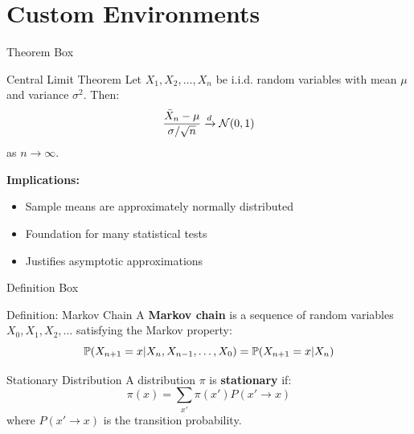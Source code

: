 \documentclass[aspectratio=169]{beamer}
\begin{document}
\section{Custom Environments}

\begin{frame}{Theorem Box}
  \begin{theorembox}{Central Limit Theorem}
    Let $X_1, X_2, \ldots, X_n$ be i.i.d. random variables with mean $\mu$ and variance $\sigma^2$. Then:
    $$\frac{\bar{X}_n - \mu}{\sigma/\sqrt{n}} \xrightarrow{d} \mathcal{N}(0, 1)$$
    as $n \to \infty$.
  \end{theorembox}

  \vspace{0.5em}

  \textbf{Implications:}
  \begin{itemize}
    \item Sample means are approximately normally distributed
    \item Foundation for many statistical tests
    \item Justifies asymptotic approximations
  \end{itemize}
\end{frame}

\begin{frame}{Definition Box}
  \begin{definitionbox}{Definition: Markov Chain}
    A \textbf{Markov chain} is a sequence of random variables $X_0, X_1, X_2, \ldots$ satisfying the Markov property:
    $$\mathbb{P}(X_{n+1} = x | X_n, X_{n-1}, \ldots, X_0) = \mathbb{P}(X_{n+1} = x | X_n)$$
  \end{definitionbox}

  \vspace{0.5em}

  \begin{definitionbox}{Stationary Distribution}
    A distribution $\pi$ is \textbf{stationary} if:
    $$\pi(x) = \sum_{x'} \pi(x') P(x' \to x)$$
    where $P(x' \to x)$ is the transition probability.
  \end{definitionbox}
\end{frame}
\end{document}
